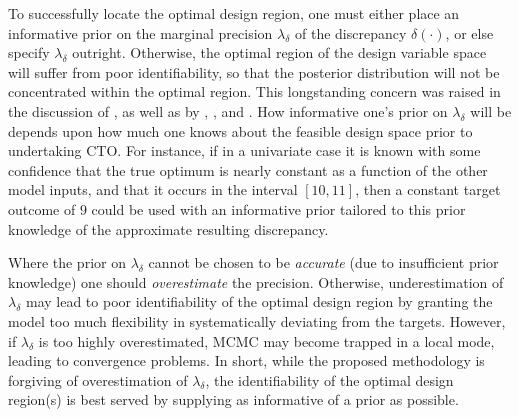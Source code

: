 \documentclass[12pt]{article}
\begin{document}
%
To successfully locate the optimal design region, one must either place an informative prior on the marginal precision $\lambda_\delta$ of the discrepancy $\delta(\cdot)$, or else specify $\lambda_\delta$ outright.
%
Otherwise, the optimal region of the design variable space will suffer from poor identifiability, so that the posterior distribution will not be concentrated within the optimal region.
%
This longstanding concern was raised in the discussion of \cite{Kennedy2001}, as well as by \cite{Bayarri2007}, \cite{Tuo2015}, and \cite{Plumlee2017}.
%
How informative one's prior on $\lambda_\delta$ will be depends upon how much one knows about the feasible design space prior to undertaking CTO.
%
For instance, if in a univariate case it is known with some confidence that the true optimum is nearly constant as a function of the other model inputs, and that it occurs in the interval $[10,11]$, then a constant target outcome of $9$ could be used with an informative prior tailored to this prior knowledge of the approximate resulting discrepancy.
%

Where the prior on $\lambda_\delta$ cannot be chosen to be \emph{accurate} (due to insufficient prior knowledge) one should \emph{overestimate} the precision.
%
Otherwise, underestimation of $\lambda_\delta$ may lead to poor identifiability of the optimal design region by granting the model too much flexibility in systematically deviating from the targets.
%
%
%
%
%
%
However, if $\lambda_\delta$ is too highly overestimated, MCMC may become trapped in a local mode, leading to convergence problems.
%
In short, while the proposed methodology is forgiving of overestimation of $\lambda_\delta$, the identifiability of the optimal design region(s) is best served by supplying as informative of a prior as possible.
\end{document}
